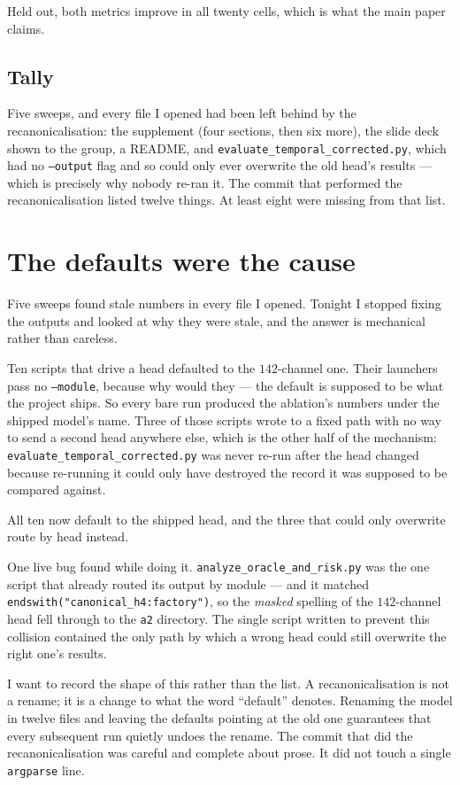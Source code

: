 \documentclass[11pt,a4paper]{article}
\begin{document}
Held out, both metrics improve in all twenty cells, which is what the main
paper claims.

\subsection*{Tally}

Five sweeps, and every file I opened had been left behind by the
recanonicalisation: the supplement (four sections, then six more), the slide
deck shown to the group, a README, and \texttt{evaluate\_temporal\_corrected.py},
which had no \texttt{--output} flag and so could only ever overwrite the old
head's results --- which is precisely why nobody re-ran it. The commit that
performed the recanonicalisation listed twelve things. At least eight were
missing from that list.


\section*{The defaults were the cause}

Five sweeps found stale numbers in every file I opened. Tonight I stopped
fixing the outputs and looked at why they were stale, and the answer is
mechanical rather than careless.

Ten scripts that drive a head defaulted to the $142$-channel one. Their
launchers pass no \texttt{--module}, because why would they --- the default is
supposed to be what the project ships. So every bare run produced the
ablation's numbers under the shipped model's name. Three of those scripts
wrote to a fixed path with no way to send a second head anywhere else, which is
the other half of the mechanism: \texttt{evaluate\_temporal\_corrected.py} was
never re-run after the head changed because re-running it could only have
destroyed the record it was supposed to be compared against.

All ten now default to the shipped head, and the three that could only
overwrite route by head instead.

One live bug found while doing it. \texttt{analyze\_oracle\_and\_risk.py} was
the one script that already routed its output by module --- and it matched
\texttt{endswith("canonical\_h4:factory")}, so the \emph{masked} spelling of
the $142$-channel head fell through to the \texttt{a2} directory. The single
script written to prevent this collision contained the only path by which a
wrong head could still overwrite the right one's results.

I want to record the shape of this rather than the list. A recanonicalisation
is not a rename; it is a change to what the word ``default'' denotes. Renaming
the model in twelve files and leaving the defaults pointing at the old one
guarantees that every subsequent run quietly undoes the rename. The commit that
did the recanonicalisation was careful and complete about prose. It did not
touch a single \texttt{argparse} line.
\end{document}
